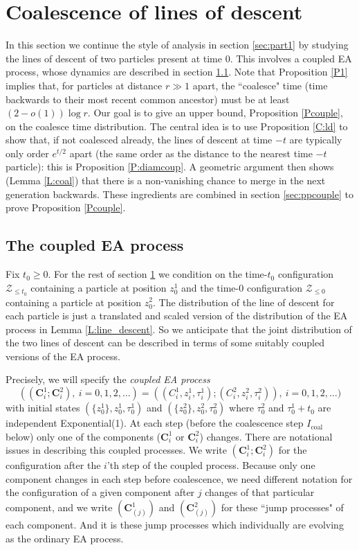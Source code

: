 \documentclass[12pt]{article}
\newcommand{\ZZ}{\mbox{${\mathcal Z}$}}
\newcommand{\bC}{{\mathbf C}}
\newcommand{\Icouple}{I_{\mathrm{coal}}}
\begin{document}
\section{Coalescence of lines of descent}
\label{sec:joint}
In this section we continue the style of analysis in section \ref{sec:part1} by 
studying the lines of descent of two particles present at time $0$.
This involves a coupled EA process, whose dynamics are described in section \ref{sec:coupled}. 
Note that Proposition \ref{P1} implies that, for particles at distance $r  \gg 1$ apart, 
the ``coalesce" time (time backwards to their most recent common ancestor) must be at least 
$(2 - o(1)) \log r$.
Our goal is to give an upper bound, Proposition \ref{Pcouple}, on the coalesce time distribution.
The central idea is to 
 use Proposition \ref{C:ld} to show that, if not coalesced already, the lines of descent at time $-t$ are typically only order $e^{t/2}$ apart 
(the same order as the distance to the nearest time $-t$ particle): this is Proposition \ref{P:diamcoup}. 
A geometric argument then shows (Lemma \ref{L:coal})  
that there is a non-vanishing chance to merge in the next generation backwards. 
These ingredients are combined in section \ref{sec:ppcouple} to prove Proposition \ref{Pcouple}.





\subsection{The coupled EA process}
\label{sec:coupled}
Fix $t_0 \ge 0$.
For the rest of section \ref{sec:joint} we condition on the time-$t_0$ configuration $\ZZ_{\le t_0}$ 
containing a particle at position $z^1_0$ and  the time-$0$ configuration $\ZZ_{\le 0}$ 
containing a particle at position $z^2_0$.
The distribution of the line of descent for each particle is just a translated and scaled version of
the distribution of  the EA process in Lemma \ref{L:line_descent}.
So we anticipate that the joint distribution of the two lines of descent can be described in terms of some suitably coupled 
versions of the EA process.

Precisely, we will specify the {\em coupled EA process} 
\[
((\bC^1_i; \bC^2_i),   \ i = 0,1,2,\ldots )   = ((C^1_i,z^1_i,\tau^1_i); (C^2_i,z^2_i,\tau^2_i)), \ i = 0,1,2,\ldots )
\]
with initial states $(\{z^1_0\}, z^1_0,\tau^1_0)$  and 
 $(\{z^2_0\}, z^2_0, \tau^2_0)$ 
where $\tau^2_0$ and $\tau^1_0 + t_0$ are independent Exponential(1).   
At each step (before the coalescence step $\Icouple$ below) only one of the components 
($\bC^1_i$ or $\bC^2_i$) changes. 
There are notational issues in describing this coupled processes.  
We write
$(\bC^1_i; \bC^2_i)$ for the configuration after the $i$'th step of the coupled process. 
Because only one component changes in each step before coalescence, we need different notation for the configuration of a given component after $j$ changes 
of that particular component, and we write
$(\bC^1_{(j)})$ and $(\bC^2_{(j)})$ for these ``jump processes" of each component. 
And it is these jump processes  which individually are evolving as the ordinary EA process.
\end{document}
